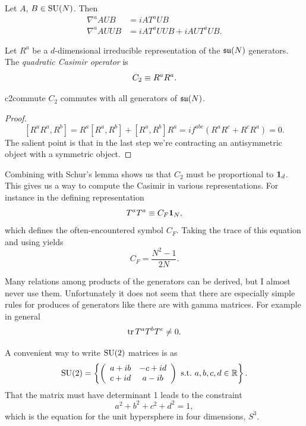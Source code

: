 \begin{example*}{}{}
Let $A$, $B\in\operatorname{SU}(N)$. Then
\begin{equation*}\begin{aligned}
\nabla^a AUB&=iAT^aUB\\
\nabla^a AUUB&=iAT^aUUB + iAUT^aUB.
\end{aligned}\end{equation*}
\end{example*}

Let $R^a$ be a $d$-dimensional irreducible representation of the
$\operatorname{\mathfrak{su}}(N)$ generators. The {\it quadratic Casimir operator}
is
\begin{equation}\index{eq:quadCasimir}
C_2\equiv R^a R^a.
\end{equation}

\begin{proposition}{}{c2commute}
$C_2$ commutes with all generators of $\operatorname{\mathfrak{su}}(N)$.
\begin{proof}
$$
\left[R^a R^a, R^b\right]=R^a\left[R^a, R^b\right]+\left[R^a, R^b\right] R^a=i
f^{a b c}\left(R^a R^c+R^c R^a\right)=0.
$$
The salient point is that in the last step we're contracting an antisymmetric
object with a symmetric object.
\end{proof}
\end{proposition}
Combining  with Schur's lemma shows us that
$C_2$ must be proportional to ${\mathbf 1}_d$. This gives us a way
to compute the Casimir in various representations. For
instance in the defining representation
\begin{equation}
T^aT^a\equiv C_F{\mathbf 1}_N,
\end{equation}
which defines the often-encountered symbol $C_F$.
Taking the trace of this equation and using
 yields
\begin{equation}
C_F=\frac{N^2-1}{2N}.
\end{equation}

Many relations among products of the generators can be derived, but
I almost never use them. Unfortunately it does not seem that there
are especially simple rules for produces of generators like there
are with gamma matrices. For example in general
\begin{equation}
\tr T^aT^bT^c\neq0.
\end{equation}

A convenient way to write $\operatorname{SU}(2)$ matrices is as
\begin{equation}
\operatorname{SU}(2)=\left\{
\left(\begin{array}{cc}
          a+ib   & -c+id  \\ 
          c+id   &  a-ib  \\
            \end{array}\right)~\text{s.t.}~ a,b,c,d\in\mathbb{R} \right\}.
\end{equation} 
That the matrix must have determinant 1 leads to the constraint
\begin{equation}
a^2+b^2+c^2+d^2=1,
\end{equation} 
which is the equation for the unit hypersphere in four dimensions, $S^3$. 

